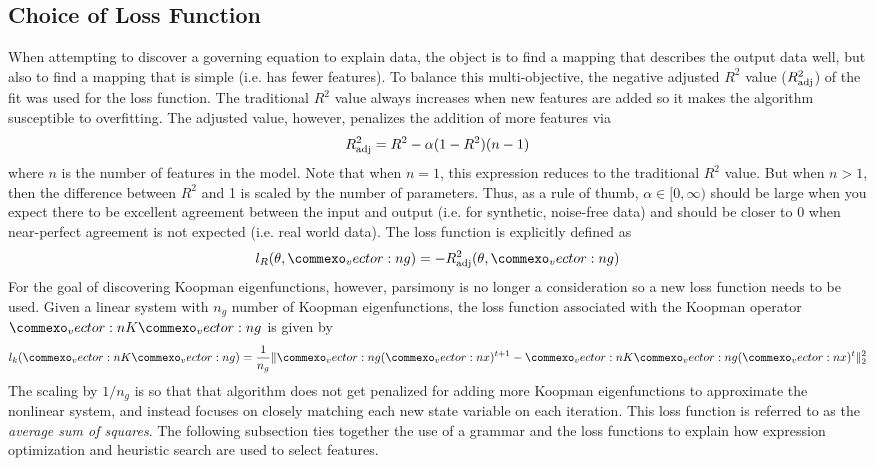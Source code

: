 \documentclass{article}
\renewcommand{\vec}[1]{\vect{#1}}
\newcommand{\mat}[1]{\vect{#1}}
\begin{document}
\subsection{Choice of Loss Function}
\label{lossfunction}
When attempting to discover a governing equation to explain data, the object is to find a mapping that describes the output data well, but also to find a mapping that is simple (i.e. has fewer features). To balance this multi-objective, the negative adjusted $R^2$ value ($R_{\rm adj}^2$) of the fit was used for the loss function. The traditional $R^2$ value always increases when new features are added so it makes the algorithm susceptible to overfitting. The adjusted value, however, penalizes the addition of more features via
\begin{equation} 
R_{\rm adj}^2 = R^2 - \alpha (1-  R^2)(n-1)
\end{equation}
where $n$ is the number of features in the model. Note that when $n=1$, this expression reduces to the traditional $R^2$ value. But when $n>1$, then the difference between $R^2$ and 1 is scaled by the number of parameters. Thus, as a rule of thumb, $\alpha \in [0, \infty)$ should be large when you expect there to be excellent agreement between the input and output (i.e. for synthetic, noise-free data) and should be closer to 0 when near-perfect agreement is not expected (i.e. real world data). The loss function is explicitly defined as 
\begin{equation}
    l_R(\theta, \vec{g}) = - R_{\rm adj}^2(\theta, \vec{g})
\end{equation}
For the goal of discovering Koopman eigenfunctions, however, parsimony is no longer a consideration so a new loss function needs to be used. Given a linear system with $n_g$ number of Koopman eigenfunctions, the loss function associated with the Koopman operator $\mat{K} \vec{g}$ is given by
\begin{equation} l_k(\mat{K} \vec{g}) = \frac{1}{n_g}\lVert \vec{g}(\vec{x})^{t+1} - \mat{K} \vec{g}(\vec{x})^{t}\rVert _2^2 \end{equation}
The scaling by $1/n_g$ is so that that algorithm does not get penalized for adding more Koopman eigenfunctions to approximate the nonlinear system, and instead focuses on closely matching each new state variable on each iteration. This loss function is referred to as the \emph{average sum of squares}. The following subsection ties together the use of a grammar and the loss functions to explain how expression optimization and heuristic search are used to select features.
\end{document}
